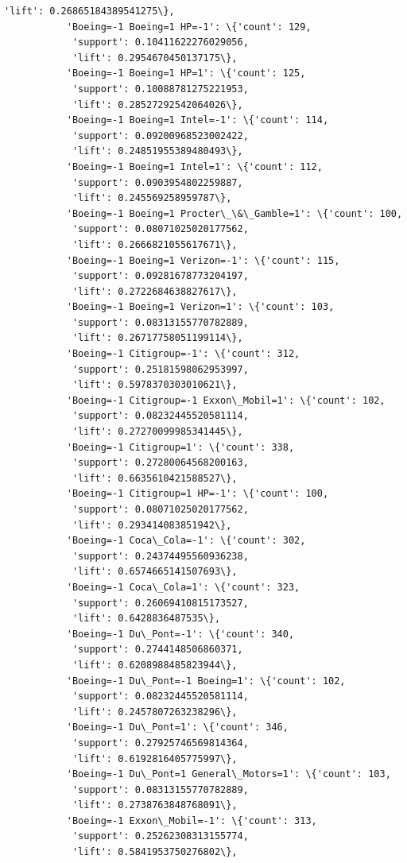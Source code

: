 \documentclass[11pt]{article}
\begin{document}
\begin{Verbatim}[commandchars=\\\{\}]
            'lift': 0.26865184389541275\},
           'Boeing=-1 Boeing=1 HP=-1': \{'count': 129,
            'support': 0.10411622276029056,
            'lift': 0.2954670450137175\},
           'Boeing=-1 Boeing=1 HP=1': \{'count': 125,
            'support': 0.10088781275221953,
            'lift': 0.28527292542064026\},
           'Boeing=-1 Boeing=1 Intel=-1': \{'count': 114,
            'support': 0.09200968523002422,
            'lift': 0.24851955389480493\},
           'Boeing=-1 Boeing=1 Intel=1': \{'count': 112,
            'support': 0.0903954802259887,
            'lift': 0.245569258959787\},
           'Boeing=-1 Boeing=1 Procter\_\&\_Gamble=1': \{'count': 100,
            'support': 0.08071025020177562,
            'lift': 0.2666821055617671\},
           'Boeing=-1 Boeing=1 Verizon=-1': \{'count': 115,
            'support': 0.09281678773204197,
            'lift': 0.2722684638827617\},
           'Boeing=-1 Boeing=1 Verizon=1': \{'count': 103,
            'support': 0.08313155770782889,
            'lift': 0.26717758051199114\},
           'Boeing=-1 Citigroup=-1': \{'count': 312,
            'support': 0.25181598062953997,
            'lift': 0.5978370303010621\},
           'Boeing=-1 Citigroup=-1 Exxon\_Mobil=1': \{'count': 102,
            'support': 0.08232445520581114,
            'lift': 0.27270099985341445\},
           'Boeing=-1 Citigroup=1': \{'count': 338,
            'support': 0.27280064568200163,
            'lift': 0.6635610421588527\},
           'Boeing=-1 Citigroup=1 HP=-1': \{'count': 100,
            'support': 0.08071025020177562,
            'lift': 0.293414083851942\},
           'Boeing=-1 Coca\_Cola=-1': \{'count': 302,
            'support': 0.24374495560936238,
            'lift': 0.6574665141507693\},
           'Boeing=-1 Coca\_Cola=1': \{'count': 323,
            'support': 0.26069410815173527,
            'lift': 0.6428836487535\},
           'Boeing=-1 Du\_Pont=-1': \{'count': 340,
            'support': 0.2744148506860371,
            'lift': 0.6208988485823944\},
           'Boeing=-1 Du\_Pont=-1 Boeing=1': \{'count': 102,
            'support': 0.08232445520581114,
            'lift': 0.2457807263238296\},
           'Boeing=-1 Du\_Pont=1': \{'count': 346,
            'support': 0.27925746569814364,
            'lift': 0.6192816405775997\},
           'Boeing=-1 Du\_Pont=1 General\_Motors=1': \{'count': 103,
            'support': 0.08313155770782889,
            'lift': 0.2738763848768091\},
           'Boeing=-1 Exxon\_Mobil=-1': \{'count': 313,
            'support': 0.25262308313155774,
            'lift': 0.5841953750276802\},

\end{Verbatim}
\end{document}

